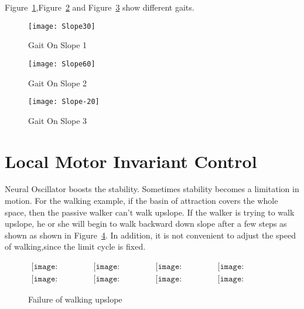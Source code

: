 Figure~\ref{fig:ss1},Figure~\ref{fig:ss2} and Figure~\ref{fig:ss3} show different gaits.

\begin{figure}[!htbp]
  \begin{center}
      \texttt{[image: Slope30]}
    \caption{Gait On Slope 1} 
    \label{fig:ss1}
\end{center}
\end{figure}

\begin{figure}[!htbp]
  \begin{center}
      \texttt{[image: Slope60]}
    \caption{Gait On Slope 2}
    \label{fig:ss2}
\end{center}
\end{figure}

\begin{figure}[!htbp]
  \begin{center}
      \texttt{[image: Slope-20]}
    \caption{Gait On Slope 3}
    \label{fig:ss3}
\end{center}
\end{figure}






\section{Local Motor Invariant Control}
Neural Oscillator boosts the stability.
Sometimes stability becomes a limitation in motion.
For the walking example, if the basin of attraction covers the whole space, then the passive walker can't walk upslope.
If the walker is trying to walk upslope, he or she will begin to walk backward down slope after a few steps as shown as shown in Figure~\ref{fig:localcontrolwalking}.
In addition,  it is not convenient to adjust the speed of walking,since the limit cycle is fixed.




\begin{figure}[!htbp]
  \begin{center}
         $\begin{array}{cccc}
\texttt{[image: UpFall/0001.eps]}&
\texttt{[image: UpFall/0051.eps]}&
\texttt{[image: UpFall/0101.eps]}&
\texttt{[image: UpFall/0151.eps]}
\\
\texttt{[image: UpFall/0201.eps]}&
\texttt{[image: UpFall/0251.eps]}&
\texttt{[image: UpFall/0301.eps]}&
\texttt{[image: UpFall/0351.eps]}
\end{array}$
    \caption{Failure of walking upslope}
    \label{fig:localcontrolwalking}
\end{center}
\end{figure}

